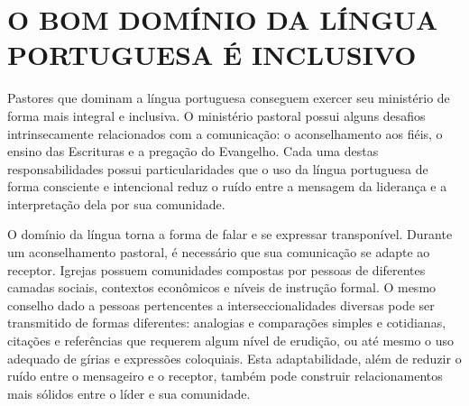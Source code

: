 \documentclass[
    article,            %
	12pt,				%
	oneside,			%
	a4paper,			%
	chapter=TITLE,		%
	section=TITLE,		%
	english,			%
	french,				%
	spanish,			%
	brazil				%
	]{abntex2}
\begin{document}



\imprimircapa

\imprimirfolhaderosto


\textual
\pagestyle{simple}



\section*{O BOM DOMÍNIO DA LÍNGUA PORTUGUESA É INCLUSIVO}
Pastores que dominam a língua portuguesa conseguem exercer seu ministério de forma mais integral e inclusiva. O ministério pastoral possui alguns desafios intrinsecamente relacionados com a comunicação: o aconselhamento aos fiéis, o ensino das Escrituras e a pregação do Evangelho. Cada uma destas responsabilidades possui particularidades que o uso da língua portuguesa de forma consciente e intencional reduz o ruído entre a mensagem da liderança e a interpretação dela por sua comunidade.

O domínio da língua torna a forma de falar e se expressar transponível. Durante um aconselhamento pastoral, é necessário que sua comunicação se adapte ao receptor. Igrejas possuem comunidades compostas por pessoas de diferentes camadas sociais, contextos econômicos e níveis de instrução formal. O mesmo conselho dado a pessoas pertencentes a interseccionalidades diversas pode ser transmitido de formas diferentes: analogias e comparações simples e cotidianas, citações e referências que requerem algum nível de erudição, ou até mesmo o uso adequado de gírias e expressões coloquiais. Esta adaptabilidade, além de reduzir o ruído entre o mensageiro e o receptor, também pode construir relacionamentos mais sólidos entre o líder e sua comunidade.
\end{document}
